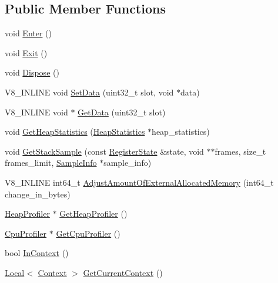 \subsection*{Public Member Functions}
\begin{DoxyCompactItemize}
\item 
void \hyperlink{classv8_1_1Isolate_aec80bb49b6b7647ff75e8f2cc9484ea3}{Enter} ()
\item 
void \hyperlink{classv8_1_1Isolate_a64a8503cafd00d1d2cadfbb0c2345054}{Exit} ()
\item 
void \hyperlink{classv8_1_1Isolate_a1a5a5762e4221aff8c6b10f9e3cec0af}{Dispose} ()
\item 
V8\+\_\+\+I\+N\+L\+I\+N\+E void \hyperlink{classv8_1_1Isolate_a2ae968a7ff8a397f1ac09d32990883f6}{Set\+Data} (uint32\+\_\+t slot, void $\ast$data)
\item 
V8\+\_\+\+I\+N\+L\+I\+N\+E void $\ast$ \hyperlink{classv8_1_1Isolate_aed85b3c82bf69a60ecebc2558ab95083}{Get\+Data} (uint32\+\_\+t slot)
\item 
void \hyperlink{classv8_1_1Isolate_add32e78544edaf8946ed9b328167e5e4}{Get\+Heap\+Statistics} (\hyperlink{classv8_1_1HeapStatistics}{Heap\+Statistics} $\ast$heap\+\_\+statistics)
\item 
void \hyperlink{classv8_1_1Isolate_a8b173b48a477267ccd6c7d17c492b82e}{Get\+Stack\+Sample} (const \hyperlink{structv8_1_1RegisterState}{Register\+State} \&state, void $\ast$$\ast$frames, size\+\_\+t frames\+\_\+limit, \hyperlink{structv8_1_1SampleInfo}{Sample\+Info} $\ast$sample\+\_\+info)
\item 
V8\+\_\+\+I\+N\+L\+I\+N\+E int64\+\_\+t \hyperlink{classv8_1_1Isolate_aaeda5fa60961a3d9d476c46200e30711}{Adjust\+Amount\+Of\+External\+Allocated\+Memory} (int64\+\_\+t change\+\_\+in\+\_\+bytes)
\item 
\hyperlink{classv8_1_1HeapProfiler}{Heap\+Profiler} $\ast$ \hyperlink{classv8_1_1Isolate_a9c48259615e8370f6f0efd27cd7f99a6}{Get\+Heap\+Profiler} ()
\item 
\hyperlink{classv8_1_1CpuProfiler}{Cpu\+Profiler} $\ast$ \hyperlink{classv8_1_1Isolate_a7eb415d9210d912aa57877ab6416fec8}{Get\+Cpu\+Profiler} ()
\item 
bool \hyperlink{classv8_1_1Isolate_afb6bbd31a87d0999dbbe5402447690a9}{In\+Context} ()
\item 
\hyperlink{classv8_1_1Local}{Local}$<$ \hyperlink{classv8_1_1Context}{Context} $>$ \hyperlink{classv8_1_1Isolate_afa1b6cde5a7a7cfde87eaabc4ab34062}{Get\+Current\+Context} ()
\item 
$$
\end{DoxyCompactItemize}

